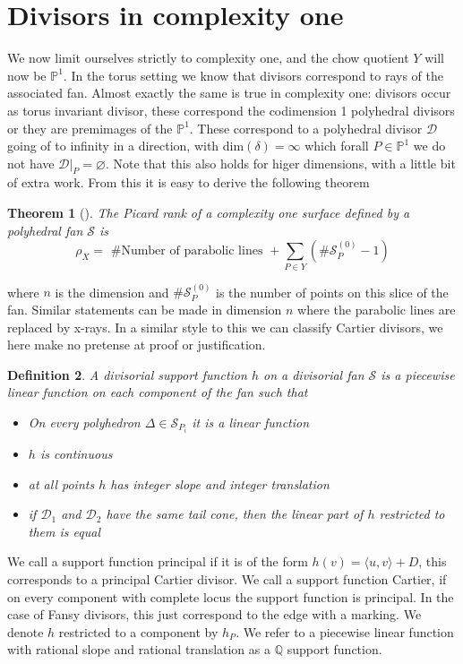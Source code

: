 \documentclass[11pt]{amsart}
\theoremstyle{plain}
\newtheorem{thm}{Theorem}[section]
\newtheorem{dfn}[thm]{Definition}
\begin{document}
\section{Divisors in complexity one}

We now limit ourselves strictly to complexity one, and the chow quotient $Y$ will now be $\mathbb{P}^1$. In the torus setting we know that divisors correspond to rays of the associated fan. Almost exactly the same is true in complexity one: divisors  occur as torus invariant divisor, these correspond the codimension 1 polyhedral divisors or they are premimages of the $\mathbb{P}^1$. These correspond to a polyhedral divisor $\mathcal{D}$  going of to infinity in a direction, with dim$(\delta) = \infty$ which forall $P \in \mathbb{P}^1$ we do not have $\mathcal{D}  |_P = \varnothing$. Note that this also holds for higer dimensions, with a little bit of extra work. From this it is easy to derive the following theorem
\\
\begin{thm}[\cite{PS}]
The Picard rank of a complexity one surface defined by a polyhedral fan $\mathcal{S}$ is 
\[
\rho_X =  \text{ \# Number of parabolic lines } + \sum_{P \in Y} (\# \mathcal{S}_P^{(0)} - 1) 
\]
\end{thm}
where $n$ is the dimension and $\# \mathcal{S}_P^{(0)}$ is the number of points on this slice of the fan. Similar statements can be made in dimension $n$ where the parabolic lines are replaced by x-rays. In a similar style to this we can classify Cartier divisors, we here make no pretense at proof or justification. 
\begin{dfn}
A divisorial support function $h$ on a divisorial fan $\mathcal{S}$ is a piecewise linear function on each component of the fan such that

\begin{itemize}
\item On every polyhedron $\Delta \in \mathcal{S}_{P_i}$ it is a linear function
\item $h$ is continuous
\item at all points $h$ has integer slope and integer translation
\item if $\mathcal{D}_1$ and $\mathcal{D}_2$ have the same tail cone, then the linear part of $h$ restricted to them is equal
\end{itemize}
\end{dfn}
We call a support function principal if it is of the form $h(v) = \langle u, v \rangle + D$, this corresponds to a principal Cartier divisor. We call a support function Cartier, if on every component with complete locus the support function is principal. In the case of Fansy divisors, this just correspond to the edge with a marking. We denote $h$ restricted to a component by $h_P$.  We refer to a piecewise linear function with rational slope and rational translation as a $\mathbb{Q}$ support function.
\end{document}
